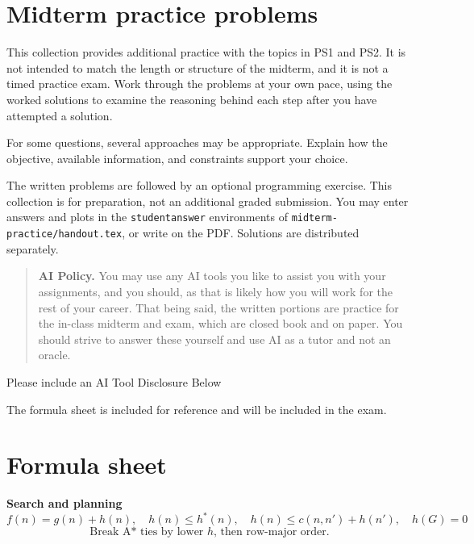 \documentclass[11pt]{article}
\title{\textbf{\coursenumber:} #1}
\author{\textbf{Due} #2\\
  }
\date{}
\DeclareRobustCommand{\callout}[2][gray!10]{%
  \begin{tcolorbox}[left=8pt, arc=0pt, outer arc=0pt,
                    colframe=#1, colback=#1, coltext=black]#2\end{tcolorbox}}
\begin{document}
\section*{Midterm practice problems}
This collection provides additional practice with the topics in PS1 and
PS2. It is not intended to match the length or structure of the midterm,
and it is not a timed practice exam. Work through the problems at your
own pace, using the worked solutions to examine the reasoning behind
each step after you have attempted a solution.

For some questions, several approaches may be appropriate.
Explain how the objective, available information, and constraints support
your choice.

The written problems are followed by an optional programming exercise.
This collection is for preparation, not an additional graded submission.
You may enter answers and plots in the \texttt{studentanswer} environments
of \texttt{midterm-practice/handout.tex}, or write on the PDF.
Solutions are distributed separately.

\begin{quote}\small\textbf{AI Policy.} You may use any AI tools you like to assist you with your assignments, and you should, as that is likely how you will work for the rest of your career.
That being said, the written portions are practice for the in-class midterm and exam, which are closed book and on paper. You should strive to answer these yourself and use AI as a tutor and not an oracle.
\end{quote}

\callout{Please include an AI Tool Disclosure Below \vspace{50pt}}

The formula sheet is included for reference and will be included in the exam.
\clearpage
\section*{Formula sheet}
\begingroup
\small
\setlength{\abovedisplayskip}{7pt}
\setlength{\belowdisplayskip}{7pt}
\textbf{Search and planning}
\[
 f(n)=g(n)+h(n),\quad h(n)\le h^*(n),\quad
 h(n)\le c(n,n')+h(n'),\quad h(G)=0
\]
\[
\text{Break A* ties by lower }h\text{, then row-major order.}
\]
\end{document}
